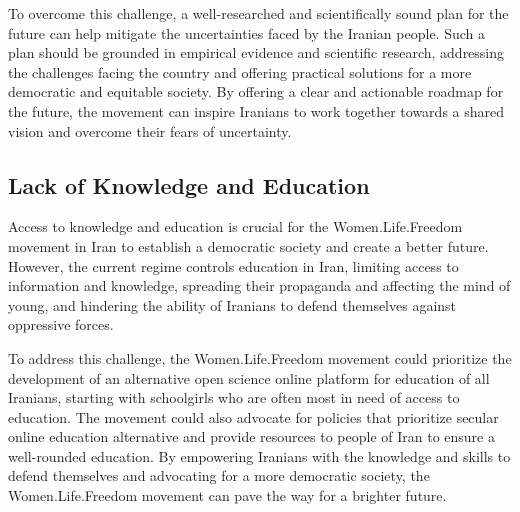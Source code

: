 \documentclass{IEEEtran}
\begin{document}
To overcome this challenge, a well-researched and scientifically sound plan for the future can help mitigate the uncertainties faced by the Iranian people. Such a plan should be grounded in empirical evidence and scientific research, addressing the challenges facing the country and offering practical solutions for a more democratic and equitable society. By offering a clear and actionable roadmap for the future, the movement can inspire Iranians to work together towards a shared vision and overcome their fears of uncertainty.

\subsection{Lack of Knowledge and Education}

Access to knowledge and education is crucial for the Women.Life.Freedom movement in Iran to establish a democratic society and create a better future. However, the current regime controls education in Iran, limiting access to information and knowledge, spreading their propaganda and affecting the mind of young, and hindering the ability of Iranians to defend themselves against oppressive forces.

To address this challenge, the Women.Life.Freedom movement could prioritize the development of an alternative open science online platform for education of all Iranians, starting with schoolgirls who are often most in need of access to education. The movement could also advocate for policies that prioritize secular online education alternative and provide resources to people of Iran to ensure a well-rounded education.
By empowering Iranians with the knowledge and skills to defend themselves and advocating for a more democratic society, the Women.Life.Freedom movement can pave the way for a brighter future.



\end{document}
